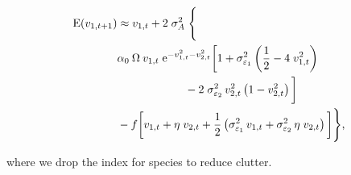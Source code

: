 \begin{equation}
\label{eq:taylor-expansion-final}
\begin{split}
    \text{E}(v_{1,t+1}) & \approx
        v_{1,t} + 2 \; \sigma_A^2 \; \Bigg\{ \\
            & \alpha_0 \: \Omega \: 
            v_{1,t} \; \text{e}^{-v_{1,t}^2 - v_{2,t}^2} 
            \bigg[ 
                1 + \sigma^2_{\varepsilon_{1}} \left( \frac{1}{2} - 4 \; v_{1,t}^2 \right) \\
                & \hspace*{6em} - 2 \; \sigma^2_{\varepsilon_{2}} \, v_{2,t}^2 \left( 1 - v_{2,t}^2 \right)
            \bigg] \\
            & - f \bigg[
                v_{1,t} + \eta \; v_{2,t} + \frac{1}{2} \left(
                    \sigma^2_{\varepsilon_{1}} \, v_{1,t} + \sigma^2_{\varepsilon_{2}} \, \eta \; v_{2,t}
                \right)
            \bigg]
        \Bigg\}
\text{,}
\end{split}
\end{equation}

where we drop the index for species to reduce clutter.


